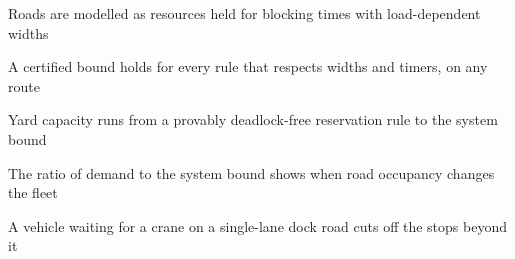 \begin{highlights}
\item Roads are modelled as resources held for blocking times with load-dependent widths
\item A certified bound holds for every rule that respects widths and timers, on any route
\item Yard capacity runs from a provably deadlock-free reservation rule to the system bound
\item The ratio of demand to the system bound shows when road occupancy changes the fleet
\item A vehicle waiting for a crane on a single-lane dock road cuts off the stops beyond it
\end{highlights}
